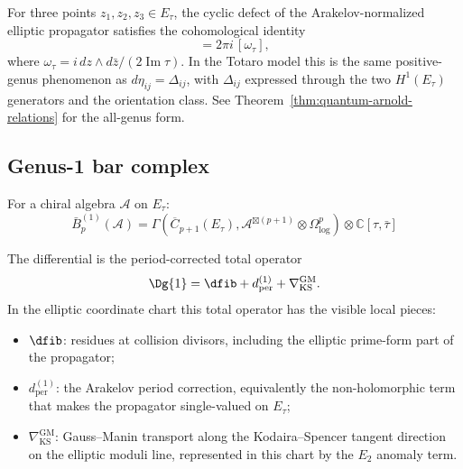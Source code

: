 \begin{theorem}
\label{thm:arnold-genus1}
For three points $z_1, z_2, z_3 \in E_\tau$, the cyclic defect of the
Arakelov-normalized elliptic propagator satisfies the cohomological
identity
\begin{equation}
[\eta_{12}^{(1)} \wedge \eta_{23}^{(1)}
+ \eta_{23}^{(1)} \wedge \eta_{31}^{(1)}
+ \eta_{31}^{(1)} \wedge \eta_{12}^{(1)}]
=2\pi i\,[\omega_\tau],
\end{equation}
where $\omega_\tau=i\,dz\wedge d\bar z/(2\operatorname{Im}\tau)$.
In the Totaro model this is the same positive-genus phenomenon as
$d\eta_{ij}=\Delta_{ij}$, with $\Delta_{ij}$ expressed through the
two $H^1(E_\tau)$ generators and the orientation class. See
Theorem~\textup{\ref{thm:quantum-arnold-relations}} for the
all-genus form.
\end{theorem}

\subsection{Genus-1 bar complex}

\begin{definition}
\label{def:genus1-bar-complex}
For a chiral algebra $\mathcal{A}$ on $E_\tau$:
\begin{equation}
\bar{B}^{(1)}_p(\mathcal{A}) = \Gamma\left(\overline{C}_{p+1}(E_\tau),
\mathcal{A}^{\boxtimes (p+1)} \otimes \Omega^p_{\log}\right) \otimes \mathbb{C}[\tau, \bar{\tau}]
\end{equation}

The differential is the period-corrected total operator
\begin{equation}
\Dg{1}
=
\dfib+d_{\mathrm{per}}^{(1)}
+\nabla_{\mathrm{KS}}^{\mathrm{GM}}.
\end{equation}
In the elliptic coordinate chart this total operator has the visible
local pieces:
\begin{itemize}
\item $\dfib$: residues at collision divisors, including the elliptic
 prime-form part of the propagator;
\item $d_{\mathrm{per}}^{(1)}$: the Arakelov period correction, equivalently
 the non-holomorphic term that makes the propagator single-valued on
 $E_\tau$;
\item $\nabla_{\mathrm{KS}}^{\mathrm{GM}}$: Gauss--Manin transport along
 the Kodaira--Spencer tangent direction on the elliptic moduli line,
 represented in this chart by the $E_2$ anomaly term.
\end{itemize}
\end{definition}

